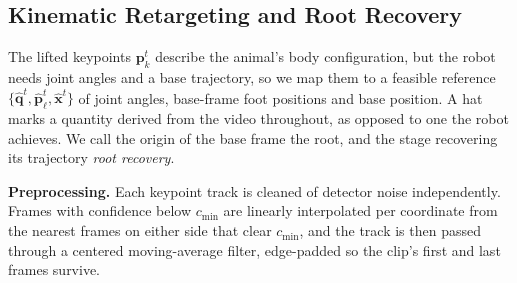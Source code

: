 \documentclass[letterpaper, 10 pt, conference]{ieeeconf}
\begin{document}

%



\subsection{Kinematic Retargeting and Root Recovery}\label{subsec:retarget}
\noindent
The lifted keypoints $\mathbf{p}_k^t$ describe the animal's body configuration, but the robot needs joint angles and a base trajectory, so we map them to a feasible reference $\{\hat{\mathbf{q}}^t,\hat{\mathbf{p}}_\ell^t,\hat{\mathbf{x}}^t\}$ of joint angles, base-frame foot positions and base position. A hat marks a quantity derived from the video throughout, as opposed to one the robot achieves. We call the origin of the base frame the root, and the stage recovering its trajectory \textit{root recovery}.




\textbf{Preprocessing.} 
Each keypoint track is cleaned of detector noise independently. Frames with confidence below $c_{\min}$ are linearly interpolated per coordinate from the nearest frames on either side that clear $c_{\min}$, and the track is then passed through a centered moving-average filter, edge-padded so the clip's first and last frames survive.
\end{document}
